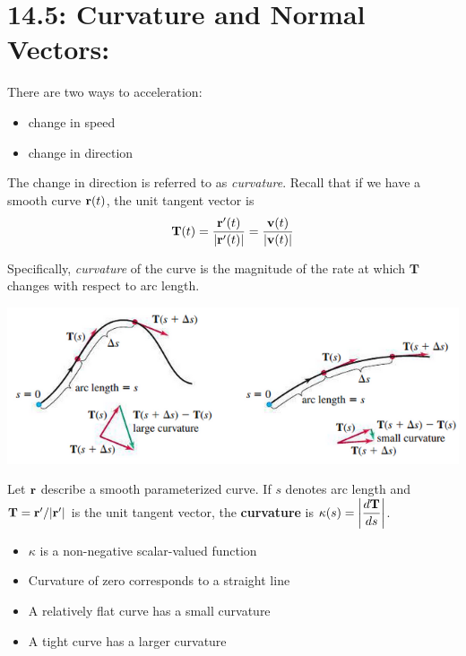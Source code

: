 \documentclass[mathNotesPreamble]{subfiles}
\begin{document}
\section{14.5: Curvature and Normal Vectors:}

  There are two ways to acceleration:
  \begin{itemize}
    \item 
      change in speed
    \item 
      change in direction
  \end{itemize}
  The change in direction is referred to as \textit{curvature}. Recall that if we have a smooth curve ${\mathbf{r}}(t)$, the unit tangent vector is
    \[\mathbf T(t)=\frac{{\mathbf{r}}'(t)}{{\left\vert{\mathbf{r}}'(t)\right\vert}}=\frac{{\mathbf{v}}(t)}{{\left\vert{\mathbf{v}}(t)\right\vert}}\]

  Specifically, \textit{curvature} of the curve is the magnitude of the rate at which $\mathbf T$ changes with respect to arc length.

  \begin{center}
    \includegraphics[width=0.8\linewidth]{images/briggs_14_05/fig14_29}
  \end{center}

  \begin{defn*}[Curvature]
    Let ${\mathbf{r}}$ describe a smooth parameterized curve. If $s$ denotes arc length and $\mathbf T={\mathbf{r}}'/{\left\vert{\mathbf{r}}'\right\vert}$ is the unit tangent vector, the \textbf{curvature} is $\displaystyle\kappa(s)={\left\vert\frac{d\mathbf T}{ds}\right\vert}$.
  \end{defn*}
  \pagebreak

  \noindent
  \begin{itemize}
    \item 
      $\kappa$ is a non-negative scalar-valued function
    \item 
      Curvature of zero corresponds to a straight line
    \item 
      A relatively flat curve has a small curvature
    \item 
      A tight curve has a larger curvature
  \end{itemize}
\end{document}
